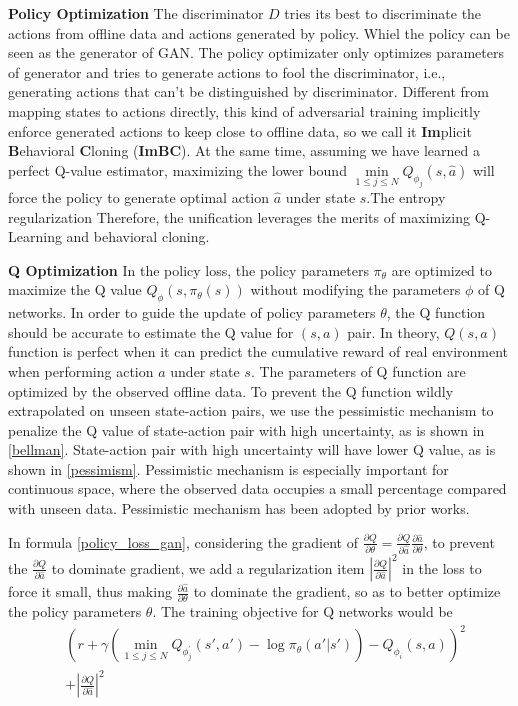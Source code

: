 \documentclass[nohyperref]{article}
\theoremstyle{plain}
\theoremstyle{definition}
\theoremstyle{remark}
\begin{document}
\textbf{Policy Optimization} The discriminator $D$ tries its best to discriminate the actions from offline data and actions generated by policy. Whiel the policy can be seen as the generator of GAN. The policy optimizater only optimizes parameters of generator and tries to generate actions to fool the discriminator, i.e., generating actions that can't be distinguished by discriminator. Different from mapping states to actions directly, this kind of adversarial training implicitly enforce generated actions to keep close to offline data, so we call it \textbf{Im}plicit \textbf{B}ehavioral \textbf{C}loning (\textbf{ImBC}). At the same time, assuming we have learned a perfect Q-value estimator, maximizing the lower bound $\underset{1\le j\le N}{\min}Q_{\phi _j}(s,\hat{a})$ will force the policy to generate optimal action $\hat{a}$ under state $s$.The entropy regularization
Therefore, the unification leverages the merits of maximizing Q-Learning and behavioral cloning.

\textbf{Q Optimization} In the policy loss, the policy parameters $\pi_{\theta}$ are optimized to maximize the Q value $Q_{\phi}(s, \pi_{\theta}(s))$ without modifying the parameters ${\phi}$ of Q networks. In order to guide the update of policy parameters ${\theta}$, the Q function should be accurate to estimate the Q value for $(s,a)$ pair. In theory, $Q(s,a)$ function is perfect when it can predict the cumulative reward of real environment when performing action $a$ under state $s$. The parameters of Q function are optimized by the observed offline data. To prevent the Q function wildly extrapolated on unseen state-action pairs, we use the pessimistic mechanism to penalize the Q value of state-action pair with high uncertainty, as is shown in \eqref{bellman}. State-action pair with high uncertainty will have lower Q value, as is shown in \eqref{pessimism}. Pessimistic mechanism is especially important for continuous space, where the observed data occupies a small percentage compared with unseen data. Pessimistic mechanism has been adopted by prior works\cite{cql, edac}.

In formula \eqref{policy_loss_gan}, considering the gradient of $
\frac{\partial Q}{\partial \theta}=\frac{\partial Q}{\partial \hat{a}}\frac{\partial \hat{a}}{\partial \theta}
$, to prevent the $\frac{\partial Q}{\partial \hat{a}}$ to dominate gradient, we add a regularization item $\left| \frac{\partial Q}{\partial \hat{a}} \right|^2$ in the loss to force it small, thus making $\frac{\partial \hat{a}}{\partial \theta}$ to dominate the gradient, so as to better optimize the policy parameters $\theta$. The training objective for Q networks would be
\begin{equation}
\begin{aligned}
\label{Q_loss}
& \left(r+\gamma ( \underset{1\le j\le N}{\min}Q_{\phi _{j}^{'}}( s',a') -\log \pi _{\theta}( a'|s') ) - Q_{\phi _i}(s,a) \right)^2  \\  &+ \left| \frac{\partial Q}{\partial \hat{a}} \right|^2
\end{aligned}
\end{equation}
\end{document}
